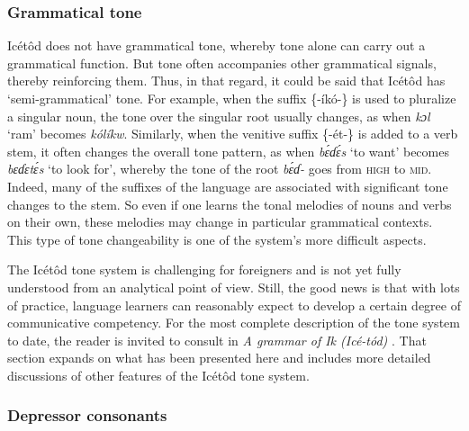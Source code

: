 \subsubsection{Grammatical tone}\label{sec:2.6.3}
\largerpage
Icétôd does not have grammatical tone, whereby tone alone can carry out a grammatical function. But tone often accompanies other grammatical signals, thereby reinforcing them. Thus, in that regard, it could be said that Icétôd has ‘semi-gramma\-tical’ tone. For example, when the suffix \{-íkó-\} is used to pluralize a singular noun, the tone over the singular root usually changes, as when \textit{kɔl} ‘ram’ becomes \textit{kólíkw\ᵃ}. Similarly, when the venitive suffix \{-ét-\} is added to a verb stem, it often changes the overall tone pattern, as when \textit{b\'{ɛ}ɗ\'{ɛ}s} ‘to want’ becomes \textit{bɛɗɛt\'{ɛ}s} ‘to look for’, whereby the tone of the root \textit{b\'{ɛ}ɗ-} goes from \textsc{high} to \textsc{mid}. Indeed, many of the suffixes of the language are associated with significant tone changes to the stem. So even if one learns the tonal melodies of nouns and verbs on their own, these melodies may change in particular grammatical contexts. This type of tone changeability is one of the system’s more difficult aspects.

The Icétôd tone system is challenging for foreigners and is not yet fully understood from an analytical point of view. Still, the good news is that with lots of practice, language learners can reasonably expect to develop a certain degree of communicative competency. For the most complete description of the tone system to date, the reader is invited to consult  in \textit{A grammar of Ik (Icé-tód)} \citep{Schrock2014}. That section expands on what has been presented here and includes more detailed discussions of other features of the Icétôd tone system.
 
\subsubsection{Depressor consonants}\label{sec:2.6.4} 

